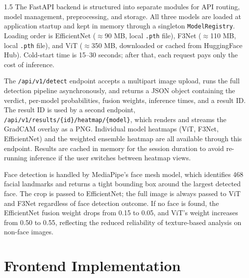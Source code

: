 \begin{spacing}{1.5}
The FastAPI backend is structured into separate modules for API routing, model management, preprocessing, and storage. All three models are loaded at application startup and kept in memory through a singleton \texttt{ModelRegistry}. Loading order is EfficientNet ($\approx$90 MB, local \texttt{.pth} file), F3Net ($\approx$110 MB, local \texttt{.pth} file), and ViT ($\approx$350 MB, downloaded or cached from HuggingFace Hub). Cold-start time is 15--30 seconds; after that, each request pays only the cost of inference.

The \texttt{/api/v1/detect} endpoint accepts a multipart image upload, runs the full detection pipeline asynchronously, and returns a JSON object containing the verdict, per-model probabilities, fusion weights, inference times, and a result ID. The result ID is used by a second endpoint, \texttt{/api/v1/results/\{id\}/heatmap/\{model\}}, which renders and streams the GradCAM overlay as a PNG. Individual model heatmaps (ViT, F3Net, EfficientNet) and the weighted ensemble heatmap are all available through this endpoint. Results are cached in memory for the session duration to avoid re-running inference if the user switches between heatmap views.

Face detection is handled by MediaPipe's face mesh model, which identifies 468 facial landmarks and returns a tight bounding box around the largest detected face. The crop is passed to EfficientNet; the full image is always passed to ViT and F3Net regardless of face detection outcome. If no face is found, the EfficientNet fusion weight drops from 0.15 to 0.05, and ViT's weight increases from 0.50 to 0.55, reflecting the reduced reliability of texture-based analysis on non-face images.
\end{spacing}

\section{Frontend Implementation}

